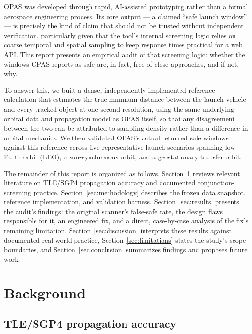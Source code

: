 \documentclass[11pt,a4paper]{article}
\begin{document}
OPAS was developed through rapid, AI-assisted prototyping rather than a formal
aerospace engineering process. Its core output --- a claimed ``safe launch
window'' --- is precisely the kind of claim that should not be trusted without
independent verification, particularly given that the tool's internal screening
logic relies on coarse temporal and spatial sampling to keep response times
practical for a web API. This report presents an empirical audit of that
screening logic: whether the windows OPAS reports as safe are, in fact, free of
close approaches, and if not, why.

To answer this, we built a dense, independently-implemented reference
calculation that estimates the true minimum distance between the launch
vehicle and every tracked object at one-second resolution, using the same
underlying orbital data and propagation model as OPAS itself, so that any
disagreement between the two can be attributed to sampling density rather than
a difference in orbital mechanics. We then validated OPAS's actual returned
safe windows against this reference across five representative launch
scenarios spanning low Earth orbit (LEO), a sun-synchronous orbit, and a
geostationary transfer orbit.

The remainder of this report is organized as follows. Section~\ref{sec:background}
reviews relevant literature on TLE/SGP4 propagation accuracy and documented
conjunction-screening practice. Section~\ref{sec:methodology} describes the
frozen data snapshot, reference implementation, and validation harness.
Section~\ref{sec:results} presents the audit's findings: the original
scanner's false-safe rate, the design flaws responsible for it, an engineered
fix, and a direct, case-by-case analysis of the fix's remaining limitation.
Section~\ref{sec:discussion} interprets these results against documented
real-world practice, Section~\ref{sec:limitations} states the study's scope
boundaries, and Section~\ref{sec:conclusion} summarizes findings and proposes
future work.

\section{Background}
\label{sec:background}

\subsection{TLE/SGP4 propagation accuracy}
\end{document}
